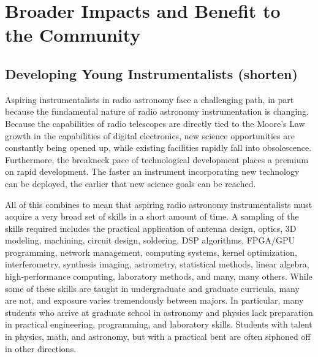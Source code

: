 \documentclass[preprint]{aastex}
\begin{document}

\section{Broader Impacts and Benefit to the Community}
\label{BIsec}

\subsection{Developing Young Instrumentalists (shorten)}

Aspiring instrumentalists in radio astronomy face a challenging path, in part because
the fundamental nature of radio astronomy instrumentation is changing.
Because the capabilities of radio telescopes are directly tied to the Moore's Law
growth in the capabilities of digital electronics,
new science opportunities are constantly being opened up, while existing
facilities rapidly fall into obsolescence.
Furthermore,
the breakneck pace of technological development places a premium on rapid development.
The faster an instrument incorporating new technology can be deployed,
the earlier that new science goals can be reached.

All of this combines to mean that aspiring radio astronomy instrumentalists must acquire a very broad
set of skills in a short amount of time.  A sampling of the skills required includes the practical
application of antenna design, optics,
3D modeling, machining, circuit design, soldering, DSP algorithms, FPGA/GPU programming, network management,
computing systems, kernel optimization, interferometry, synthesis imaging, astrometry, statistical methods, linear
algebra, high-performance
computing, laboratory methods, and many, many others.  While some of these skills are taught
in undergraduate and graduate
curricula, many are not, and exposure varies tremendously between majors.  In particular,
many students who arrive at graduate school in astronomy and physics
lack preparation in
practical engineering, programming, and laboratory skills.  Students with talent in physics, math, and astronomy,
but with a practical bent are often siphoned off in other directions.
\end{document}
